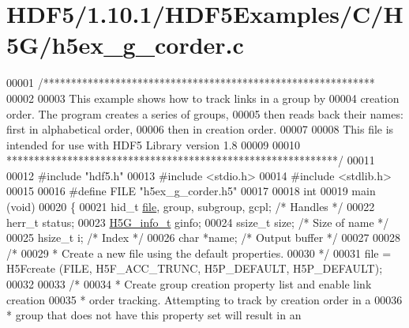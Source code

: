 \hypertarget{_h_d_f5_21_810_81_2_h_d_f5_examples_2_c_2_h5_g_2h5ex__g__corder_8c_source}{}\section{H\+D\+F5/1.10.1/\+H\+D\+F5\+Examples/\+C/\+H5\+G/h5ex\+\_\+g\+\_\+corder.c}
\label{_h_d_f5_21_810_81_2_h_d_f5_examples_2_c_2_h5_g_2h5ex__g__corder_8c_source}

\begin{DoxyCode}
00001 \textcolor{comment}{/************************************************************}
00002 \textcolor{comment}{}
00003 \textcolor{comment}{  This example shows how to track links in a group by}
00004 \textcolor{comment}{  creation order.  The program creates a series of groups,}
00005 \textcolor{comment}{  then reads back their names: first in alphabetical order,}
00006 \textcolor{comment}{  then in creation order.}
00007 \textcolor{comment}{}
00008 \textcolor{comment}{  This file is intended for use with HDF5 Library version 1.8}
00009 \textcolor{comment}{}
00010 \textcolor{comment}{ ************************************************************/}
00011 
00012 \textcolor{preprocessor}{#include "hdf5.h"}
00013 \textcolor{preprocessor}{#include <stdio.h>}
00014 \textcolor{preprocessor}{#include <stdlib.h>}
00015 
00016 \textcolor{preprocessor}{#define FILE       "h5ex\_g\_corder.h5"}
00017 
00018 \textcolor{keywordtype}{int}
00019 main (\textcolor{keywordtype}{void})
00020 \{
00021     hid\_t       \hyperlink{structfile}{file}, group, subgroup, gcpl;        \textcolor{comment}{/* Handles */}
00022     herr\_t      status;
00023     \hyperlink{struct_h5_g__info__t}{H5G\_info\_t}  ginfo;
00024     ssize\_t     size;                               \textcolor{comment}{/* Size of name */}
00025     hsize\_t     i;                                  \textcolor{comment}{/* Index */}
00026     \textcolor{keywordtype}{char}        *name;                              \textcolor{comment}{/* Output buffer */}
00027 
00028     \textcolor{comment}{/*}
00029 \textcolor{comment}{     * Create a new file using the default properties.}
00030 \textcolor{comment}{     */}
00031     file = H5Fcreate (FILE, H5F\_ACC\_TRUNC, H5P\_DEFAULT, H5P\_DEFAULT);
00032 
00033     \textcolor{comment}{/*}
00034 \textcolor{comment}{     * Create group creation property list and enable link creation}
00035 \textcolor{comment}{     * order tracking.  Attempting to track by creation order in a}
00036 \textcolor{comment}{     * group that does not have this property set will result in an}

\end{DoxyCode}

